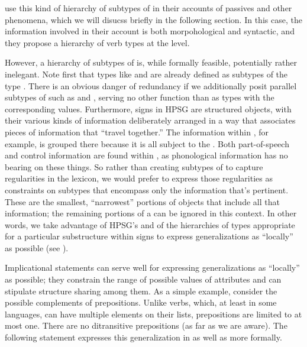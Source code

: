 \documentclass[output=paper
	        ,collection
	        ,collectionchapter
 	        ,biblatex
                ,babelshorthands
                ,newtxmath
                ,draftmode
                ,colorlinks, citecolor=brown
]{langscibook}
\begin{document}
\citet{AckermanandWebelhuth1998}
 use this kind of hierarchy of subtypes of  in their accounts of  passives and other phenomena, which we will disucss briefly in the following section.
In this case, the information involved in their account is both morpohological and syntactic, and they propose a hierarchy of verb types at the  level.

However, a hierarchy of subtypes of  is, while formally feasible, potentially rather inelegant.
Note first that types like  and  are already defined as subtypes of the type .
There is an obvious danger of redundancy if we additionally posit parallel subtypes of  such as  and  , serving no other function than as types with the corresponding  values.
Furthermore, signs in HPSG are structured objects, with their various kinds of information deliberately arranged in a way that associates pieces of information that ``travel together.''
The information within , for example, is grouped there because it is all subject to the .
Both part-of-speech and control information are found within , as phonological information has no bearing on these things.
So rather than creating subtypes of  to capture regularities in the lexicon, we would prefer to express those regularities as constraints on subtypes that encompass only the information that's pertinent.
These are the smallest, ``narrowest'' portions of  objects that include all that information; the remaining portions of a  can be ignored in this context.
In other words, we take advantage of HPSG's  and of the hierarchies of types appropriate for a particular substructure within signs to express generalizations as ``locally'' as possible (see ).

Implicational statements  can serve well for expressing generalizations as ``locally'' as possible; they constrain the range of possible values of attributes and can stipulate structure sharing among them.
As a simple example, consider the possible complements of prepositions.
Unlike verbs, which, at least in some languages, can have multiple elements on their  lists, prepositions are limited to at most one.
There are no ditransitive prepositions (as far as we are aware).
The following statement expresses this generalization in  as well as more formally.
\end{document}
